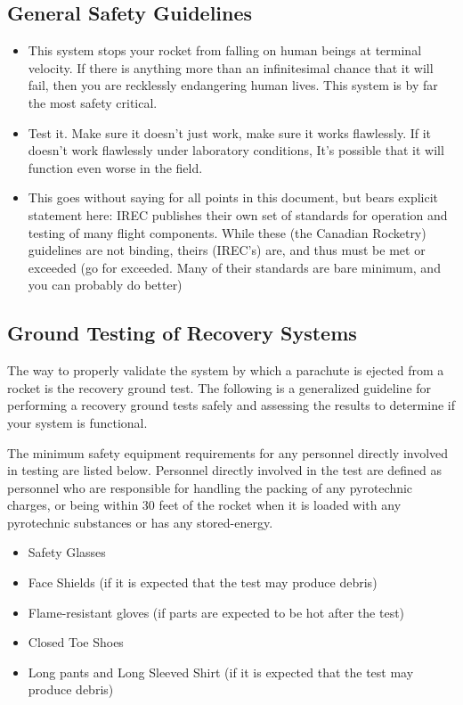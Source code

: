 \subsection{General Safety Guidelines}
\begin{itemize}
\item This system stops your rocket from falling on human beings at terminal velocity. If there is anything more than an infinitesimal chance that it will fail, then you are recklessly endangering human lives. This system is by far the most safety critical.
\item Test it. Make sure it doesn't just work, make sure it works flawlessly. If it doesn't work flawlessly under laboratory conditions, It’s possible that it will function even worse in the field.
\item This goes without saying for all points in this document, but bears explicit statement here: IREC publishes their own set of standards for operation and testing of many flight components. While these (the Canadian Rocketry) guidelines are not binding, theirs (IREC’s) are, and thus must be met or exceeded (go for exceeded. Many of their standards are bare minimum, and you can probably do better)
\end{itemize}

\subsection{Ground Testing of Recovery Systems}
The way to properly validate the system by which a parachute is ejected from a rocket is the recovery ground test. The following is a generalized guideline for performing a recovery ground tests safely and assessing the results to determine if your system is functional.
\par
The minimum safety equipment requirements for any personnel directly involved in testing are listed below. Personnel directly involved in the test are defined as personnel who are responsible for handling the packing of any pyrotechnic charges, or being within 30 feet of the rocket when it is loaded with any pyrotechnic substances or has any stored-energy.
\begin{itemize}
\item Safety Glasses
\item Face Shields (if it is expected that the test may produce debris)
\item Flame-resistant gloves (if parts are expected to be hot after the test)
\item Closed Toe Shoes
\item Long pants and Long Sleeved Shirt (if it is expected that the test may produce debris)
\end{itemize}

